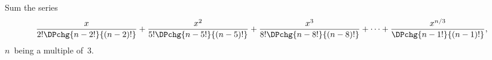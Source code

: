 Sum the series
\[
\frac{x}{2! \DPchg{n - 2!}{(n - 2)!}}
  + \frac{x^{2}}{5! \DPchg{n - 5!}{(n - 5)!}}
  + \frac{x^{3}}{8! \DPchg{n - 8!}{(n - 8)!}} + \dots
  + \frac{x^{n/3}}{\DPchg{n - 1!}{(n - 1)!}},
\]
$n$~being a multiple of~$3$. 

